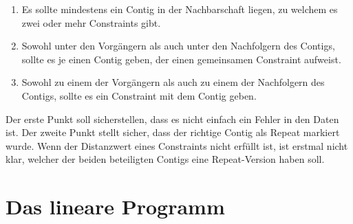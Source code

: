 \begin{enumerate}
\item Es sollte mindestens ein Contig in der Nachbarschaft liegen, zu welchem es zwei oder mehr Constraints gibt.
\item Sowohl unter den Vorgängern als auch unter den Nachfolgern des Contigs, sollte es je einen Contig geben, der einen gemeinsamen Constraint aufweist.
\item Sowohl zu einem der Vorgängern als auch zu einem der Nachfolgern des Contigs, sollte es ein Constraint mit dem Contig geben.
\end{enumerate}
Der erste Punkt soll sicherstellen, dass es nicht einfach ein Fehler in den Daten ist. Der zweite Punkt stellt sicher, dass der richtige Contig als Repeat markiert wurde. Wenn der Distanzwert eines Constraints nicht erfüllt ist, ist erstmal nicht klar, welcher der beiden beteiligten Contigs eine Repeat-Version haben soll.

\section{Das lineare Programm}

